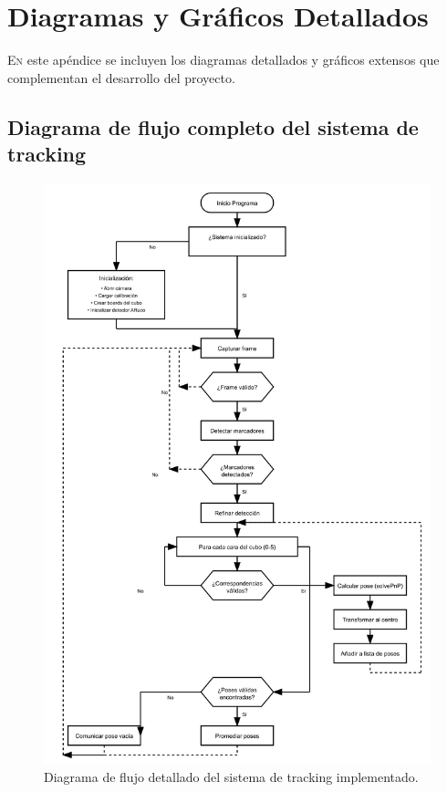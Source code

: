 \chapter{Diagramas y Gráficos Detallados}
\label{chap:diagramas_detallados}

\lettrine{E}{n} este apéndice se incluyen los diagramas detallados y gráficos extensos que complementan el desarrollo del proyecto.

\section{Diagrama de flujo completo del sistema de tracking}

\begin{figure}[h!]
	\centering
	\includegraphics[width=1.0\textwidth]{imaxes/flujo_tfg_correcto.png}
	\caption{Diagrama de flujo detallado del sistema de tracking implementado.}
	\label{fig:flujo_tfg_detallado}
\end{figure}

